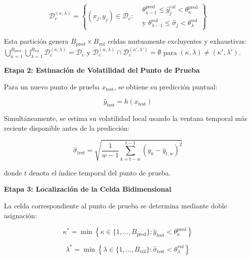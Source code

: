 \begin{equation}
\mathcal{D}_c^{(\kappa,\lambda)} = \left\{(x_j, y_j) \in \mathcal{D}_c : 
\begin{aligned}
&\theta_{\kappa-1}^{\text{pred}} \leq \hat{y}_j^{\text{cal}} < \theta_{\kappa}^{\text{pred}} \\
&\text{y } \theta_{\lambda-1}^{\text{vol}} \leq \hat{\sigma}_j < \theta_{\lambda}^{\text{vol}}
\end{aligned}
\right\}
\label{eq:avmcps_cell_definition}
\end{equation}

Esta partición genera $B_{\text{pred}} \times B_{\text{vol}}$ celdas mutuamente excluyentes y exhaustivas: $\bigcup_{\kappa=1}^{B_{\text{pred}}} \bigcup_{\lambda=1}^{B_{\text{vol}}} \mathcal{D}_c^{(\kappa,\lambda)} = \mathcal{D}_c$ y $\mathcal{D}_c^{(\kappa,\lambda)} \cap \mathcal{D}_c^{(\kappa',\lambda')} = \emptyset$ para $(\kappa,\lambda) \neq (\kappa',\lambda')$.

\textbf{Etapa 2: Estimación de Volatilidad del Punto de Prueba}

Para un nuevo punto de prueba $x_{\text{test}}$, se obtiene su predicción puntual:

\begin{equation}
\hat{y}_{\text{test}} = h(x_{\text{test}})
\end{equation}

Simultáneamente, se estima su volatilidad local usando la ventana temporal más reciente disponible antes de la predicción:

\begin{equation}
\hat{\sigma}_{\text{test}} = \sqrt{\frac{1}{w-1} \sum_{k=t-w}^{t-1} (y_k - \bar{y}_{t,w})^2}
\end{equation}

donde $t$ denota el índice temporal del punto de prueba.

\textbf{Etapa 3: Localización de la Celda Bidimensional}

La celda correspondiente al punto de prueba se determina mediante doble asignación:

\begin{equation}
\kappa^* = \min\left\{\kappa \in \{1, \ldots, B_{\text{pred}}\} : \hat{y}_{\text{test}} < \theta_{\kappa}^{\text{pred}}\right\}
\label{eq:avmcps_pred_bin_assignment}
\end{equation}

\begin{equation}
\lambda^* = \min\left\{\lambda \in \{1, \ldots, B_{\text{vol}}\} : \hat{\sigma}_{\text{test}} < \theta_{\lambda}^{\text{vol}}\right\}
\label{eq:avmcps_vol_bin_assignment}
\end{equation}

